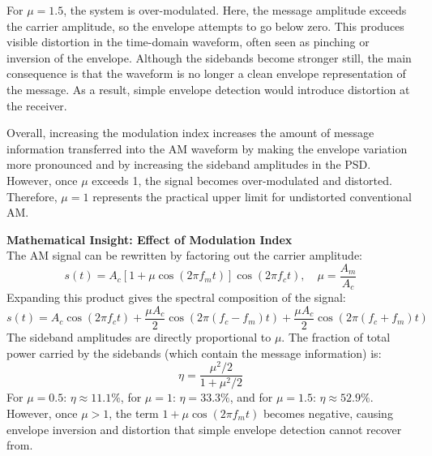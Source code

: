 \documentclass[../../main.tex]{subfiles}
\begin{document}
For $\mu = 1.5$, the system is over-modulated. Here, the message amplitude exceeds the carrier amplitude, so the envelope attempts to go below zero. This produces visible distortion in the time-domain waveform, often seen as pinching or inversion of the envelope. Although the sidebands become stronger still, the main consequence is that the waveform is no longer a clean envelope representation of the message. As a result, simple envelope detection would introduce distortion at the receiver.

Overall, increasing the modulation index increases the amount of message information transferred into the AM waveform by making the envelope variation more pronounced and by increasing the sideband amplitudes in the PSD. However, once $\mu$ exceeds 1, the signal becomes over-modulated and distorted. Therefore, $\mu = 1$ represents the practical upper limit for undistorted conventional AM.




\begin{mdframed}[linewidth=1pt]
\textbf{Mathematical Insight: Effect of Modulation Index}\\[6pt]
The AM signal can be rewritten by factoring out the carrier amplitude:
\[
s(t) = A_c\left[1 + \mu\cos(2\pi f_m t)\right]\cos(2\pi f_c t), \quad \mu = \frac{A_m}{A_c}
\]
Expanding this product gives the spectral composition of the signal:
\[
s(t) = A_c\cos(2\pi f_c t) + \frac{\mu A_c}{2}\cos(2\pi(f_c - f_m)t) + \frac{\mu A_c}{2}\cos(2\pi(f_c + f_m)t)
\]
The sideband amplitudes are directly proportional to $\mu$. The fraction of total power 
carried by the sidebands (which contain the message information) is:
\[
\eta = \frac{\mu^2/2}{1 + \mu^2/2}
\]
For $\mu = 0.5$: $\eta \approx 11.1\%$, for $\mu = 1$: $\eta = 33.3\%$, 
and for $\mu = 1.5$: $\eta \approx 52.9\%$. However, once $\mu > 1$, 
the term $1 + \mu\cos(2\pi f_m t)$ becomes negative, causing envelope inversion 
and distortion that simple envelope detection cannot recover from.
\end{mdframed}
\end{document}
